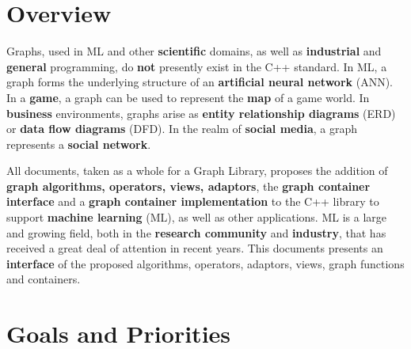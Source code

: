 
\section{Overview}

Graphs, used in ML and other \textbf{scientific} domains, as well as \textbf{industrial} and \textbf{general} programming, 
do \textbf{not} presently exist in the C++ standard. In ML, a graph forms the underlying structure of an \textbf{artificial neural network} (ANN). 
In a \textbf{game}, a graph can be used to represent the \textbf{map} of a game world. In \textbf{business} environments, graphs arise as 
\textbf{entity relationship diagrams} (ERD) or \textbf{data flow diagrams} (DFD). In the realm of \textbf{social media}, a graph represents a 
\textbf{social network}.

All documents, taken as a whole for a Graph Library, proposes the addition of \textbf{graph algorithms, operators, views, adaptors}, the 
\textbf{graph container interface} and a \textbf{graph container implementation} to the C++ library to support \textbf{machine learning} (ML), 
as well as other applications. ML is a large and growing field, both in the \textbf{research community} and \textbf{industry}, that has 
received a great deal of attention in recent years. This documents presents an \textbf{interface} of the proposed algorithms, operators, adaptors,
views, graph functions and containers.

\section{Goals and Priorities}

